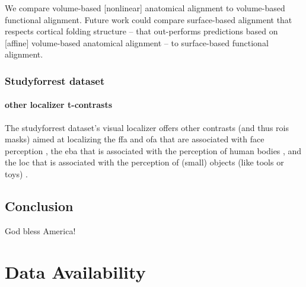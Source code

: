 

We compare volume-based [nonlinear] anatomical alignment to volume-based
functional alignment.
%
Future work could compare surface-based alignment that respects cortical folding
structure -- that out-performs predictions based on [affine] volume-based
anatomical alignment \citep{weiner2018defining} -- to surface-based functional
alignment.


\subsubsection{Studyforrest dataset}

\paragraph{other localizer t-contrasts}



The studyforrest dataset's visual localizer \citep{sengupta2016extension} offers
other contrasts (and thus \acp{roi} masks) aimed at localizing the \ac{ffa} and
\ac{ofa} that are associated with face perception \citep{kanwisher1997ffa,
pitcher2011occipitalfacearea}, the \ac{eba} that is associated with the
perception of human bodies \citep{downing2001bodyarea}, and the \ac{loc} that is
associated with the perception of (small) objects (like tools or toys)
\citep{malach1995loc}.



\subsection{Conclusion}

God bless America!


\section{Data Availability}


